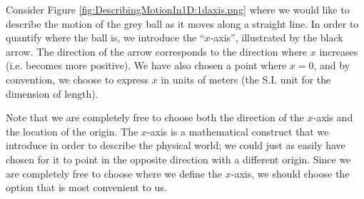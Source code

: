 Consider Figure \ref{fig:DescribingMotionIn1D:1daxis.png} where we would like to describe the motion of the grey ball as it moves along a straight line. In order to quantify where the ball is, we introduce the ``$x$-axis'', illustrated by the black arrow. The direction of the arrow corresponds to the direction where $x$ increases (i.e. becomes more positive). We have also chosen a point where $x=0$, and by convention, we choose to express $x$ in units of meters (the S.I. unit for the dimension of length).

Note that we are completely free to choose both the direction of the $x$-axis and the location of the origin. The $x$-axis is a mathematical construct that we introduce in order to describe the physical world; we could just as easily have chosen for it to point in the opposite direction with a different origin. Since we are completely free to choose where we define the $x$-axis, we should choose the option that is most convenient to us. 

